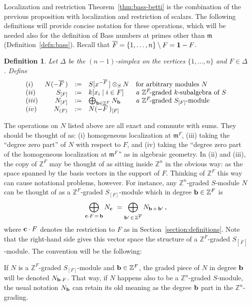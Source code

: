 \documentclass[12pt,leqno]{article}
\newtheorem{defn}[thm]{Definition}
\def\bb{{{\rm \bf b}}}
\def\cc{{{\rm \bf c}}}
\def\mm{{\mathfrak m}}
\def\ZZ{{\mathbb Z}}
\begin{document}
\begin{section}{Localization and restriction}
Theorem~\ref{thm:bass-betti} is the combination of the previous
proposition with localization and restriction of scalars.  The following
definitions will provide concise notation for these operations, which
will be needed also for the definition of Bass numbers at primes other
than $\mm$ (Definition~\ref{defn:bass}).  Recall that $\overline{F} =
\{1,\ldots,n\} \setminus F = {\bf 1} - F$.
\begin{defn} \label{defn:localization}
Let $\Delta$ be the $(n-1)$-simplex on the vertices $\{1,\ldots,n\}$ and
$F \in \Delta$.  Define
$$
\begin{array}{lrcll}
(i)
& 	N(-\overline{F}^{\,}) & := & S[x^{-\overline{F}\:}] \otimes_S N
&	\hbox{for arbitrary modules}\ N \cr
(ii)
&	S_{[F]} & := & k[x_i \mid i \in F]
&	{\it a}\ \ZZ^F\!\hbox{-graded}\ k\hbox{-subalgebra of}\ S \cr
(iii)
&	N_{[F]} & := & \bigoplus_{\bb \in \ZZ^F} N_\bb
&	{\it a}\ \ZZ^F\!\hbox{-graded}\ S_{[F]}\hbox{-module} \cr
(iv)
&	N_{(F)} & := & N(-\overline{F}^{\,})_{[F]} \cr
\end{array}
$$
\end{defn}
The operations on $N$ listed above are all exact and commute with sums.
They should be thought of as: (i) homogeneous localization at $\mm^{F}$,
(iii) taking the ``degree zero part'' of $N$ with respect to $F$, and
(iv) taking the ``degree zero part of the homogeneous localization at
$\mm^{F\,}$'' as in algebraic geometry.  In (ii) and (iii), the copy of
$\ZZ^F$ may be thought of as sitting inside $\ZZ^n$ in the obvious way:
as the space spanned by the basis vectors in the support of $F$.
Thinking of $\ZZ^F$ this way can cause notational problems, however.  For
instance, any $\ZZ^n$-graded $S$-module $N$ can be thought of as a
$\ZZ^F$-graded $S_{[F]}$-module which in degree $\bb \in \ZZ^F$ is
$$
	\bigoplus_{\cc \cdot F\,=\,\bb} N_\cc \ =
	\bigoplus_{\bb'\,\in\,\ZZ^{\overline F}} N_{\bb\,+\,\bb'}\,,
$$
where $\cc \cdot F$ denotes the restriction to $F$ as in
Section~\ref{section:definitions}.  Note that the right-hand side gives
this vector space the structure of a $\ZZ^{\overline F}$-graded
$S_{[\,{\overline F}\,]}$-module.  The convention will be the following:

\noindent
{\narrower\vbox{\noindent
If $N$ is a $\ZZ^F$-graded $S_{[F]}$-module and $\bb \in \ZZ^F$, the
graded piece of $N$ in degree $\bb$ will be denoted $N_{\bb \cdot F}$.
That way, if $N$ happens also to be a $\ZZ^n$-graded $S$-module, the
usual notation $N_\bb$ can retain its old meaning as the degree $\bb$
part in the $\ZZ^n$-grading.
}}


\end{section}
\end{document}
